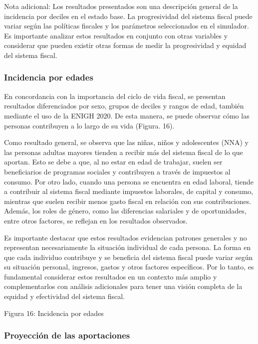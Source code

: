 Nota adicional: Los resultados presentados son una descripción general
de la incidencia por deciles en el estado base. La progresividad del
sistema fiscal puede variar según las políticas fiscales y los
parámetros seleccionados en el simulador. Es importante analizar estos
resultados en conjunto con otras variables y considerar que pueden
existir otras formas de medir la progresividad y equidad del sistema
fiscal.

\hypertarget{incidencia-por-edades}{%
\subsubsection{Incidencia por edades}\label{incidencia-por-edades}}

En concordancia con la importancia del ciclo de vida fiscal, se
presentan resultados diferenciados por sexo, grupos de deciles y rangos
de edad, también mediante el uso de la ENIGH 2020. De esta manera, se
puede observar cómo las personas contribuyen a lo largo de su vida
(Figura. 16).

Como resultado general, se observa que las niñas, niños y adolescentes
(NNA) y las personas adultas mayores tienden a recibir más del sistema
fiscal de lo que aportan. Esto se debe a que, al no estar en edad de
trabajar, suelen ser beneficiarios de programas sociales y contribuyen a
través de impuestos al consumo. Por otro lado, cuando una persona se
encuentra en edad laboral, tiende a contribuir al sistema fiscal
mediante impuestos laborales, de capital y consumo, mientras que suelen
recibir menos gasto fiscal en relación con sus contribuciones. Además,
los roles de género, como las diferencias salariales y de oportunidades,
entre otros factores, se reflejan en los resultados observados.

Es importante destacar que estos resultados evidencian patrones
generales y no representan necesariamente la situación individual de
cada persona. La forma en que cada individuo contribuye y se beneficia
del sistema fiscal puede variar según su situación personal, ingresos,
gastos y otros factores específicos. Por lo tanto, es fundamental
considerar estos resultados en un contexto más amplio y complementarlos
con análisis adicionales para tener una visión completa de la equidad y
efectividad del sistema fiscal.

Figura 16: Incidencia por edades


\hypertarget{proyecciuxf3n-de-las-aportaciones}{%
\subsubsection{Proyección de las
aportaciones}\label{proyecciuxf3n-de-las-aportaciones}}

